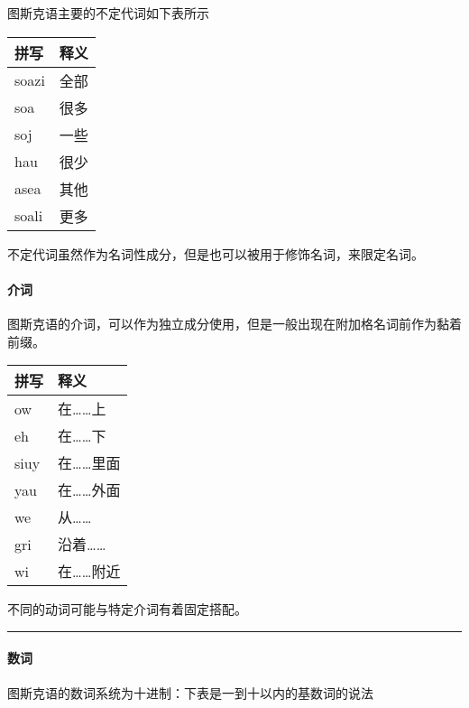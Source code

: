 \documentclass{article}
\begin{document}
图斯克语主要的不定代词如下表所示

\begin{longtable}[]{@{}ll@{}}
\toprule\noalign{}
拼写 & 释义 \\
\midrule\noalign{}
\endhead
\bottomrule\noalign{}
\endlastfoot
soazi & 全部 \\
soa & 很多 \\
soj & 一些 \\
hau & 很少 \\
asea & 其他 \\
soali & 更多 \\
\end{longtable}

不定代词虽然作为名词性成分，但是也可以被用于修饰名词，来限定名词。

\paragraph{介词}\label{ux4ecbux8bcd}

图斯克语的介词，可以作为独立成分使用，但是一般出现在附加格名词前作为黏着前缀。

\begin{longtable}[]{@{}ll@{}}
\toprule\noalign{}
拼写 & 释义 \\
\midrule\noalign{}
\endhead
\bottomrule\noalign{}
\endlastfoot
ow & 在\ldots\ldots 上 \\
eh & 在\ldots\ldots 下 \\
siuy & 在\ldots\ldots 里面 \\
yau & 在\ldots\ldots 外面 \\
we & 从\ldots\ldots{} \\
gri & 沿着\ldots\ldots{} \\
wi & 在\ldots\ldots 附近 \\
\end{longtable}

不同的动词可能与特定介词有着固定搭配。

\begin{center}\rule{0.5\linewidth}{0.5pt}\end{center}

\paragraph{数词}\label{ux6570ux8bcd}

图斯克语的数词系统为十进制：下表是一到十以内的基数词的说法
\end{document}
